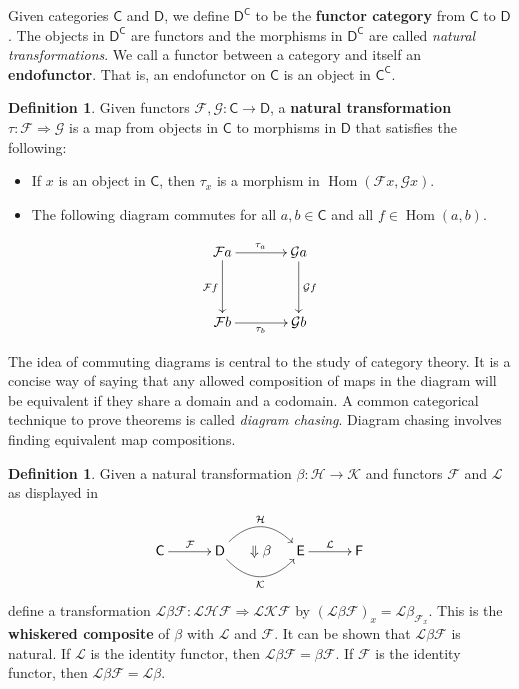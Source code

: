 \documentclass[MS, xcolor=dvipsnames]{wfuthesis}
\def\sC{\mathsf{C}}
\def\sD{\mathsf{D}}
\def\cF{\mathcal{F}}
\def\cG{\mathcal{G}}
\DeclareMathOperator{\Hom}{Hom}
\theoremstyle{definition}
\newtheorem{definition}[theorem]{Definition}
\begin{document}
Given categories $\sC$ and $\sD$, we define $\sD^\sC$ to be the \textbf{functor category} from $\sC$ to $\sD$. The objects in $\sD^\sC$ are functors and the morphisms in $\sD^\sC$ are called \emph{natural transformations}. We call a functor between a category and itself an \textbf{endofunctor}. That is, an endofunctor on $\sC$ is an object in $\sC^\sC$. 
\begin{definition}
  Given functors $\cF, \cG: \sC \to \sD$, a \textbf{natural transformation} $\tau: \cF \Rightarrow \cG$ is a map from objects in $\sC$ to morphisms in $\sD$ that satisfies the following:
  \begin{itemize}
    \item If $x$ is an object in $\sC$, then $\tau_x$ is a morphism in $\Hom(\cF x, \cG x)$. 
    \item The following diagram commutes for all $a,b \in \sC$ and all $f \in \Hom(a,b)$. 
  \end{itemize}
  \[ \SelectTips{cm}{}\xymatrix@R+1pc@C+1pc{
      \cF a \ar[r]^{\tau_a} \ar[d]_{\cF f} & \cG a \ar[d]^{\cG f} \\ \cF b \ar[r]_{\tau_b} & \cG b%
  } \]
\end{definition}
The idea of commuting diagrams is central to the study of category theory. It is a concise way of saying that any allowed composition of maps in the diagram will be equivalent if they share a domain and a codomain. A common categorical technique to prove theorems is called \emph{diagram chasing}. Diagram chasing involves finding equivalent map compositions. \par
\begin{definition}
  Given a natural transformation $\beta: \mathcal H \to \mathcal K$ and functors $\mathcal F$ and $\mathcal L$ as displayed in 
  \[ \SelectTips{cm}{}\xymatrix@C-1pc{
    \sC \ar[0,2]^{\cF} & & \sD \ar@/^1.5pc/[0,2]^{\mathcal H} \ar@/_1.5pc/[0,2]_{\mathcal K} & \Downarrow\beta & \mathsf E \ar[0,2]^{\mathcal L} & & \mathsf F
  } \]
  define a transformation $\mathcal L \beta \mathcal F: \mathcal L \mathcal H \mathcal F \Rightarrow \mathcal L \mathcal K \mathcal F$ by $(\mathcal L \beta \mathcal F)_x = \mathcal L \beta_{\mathcal F_x}$. This is the \textbf{whiskered composite} of $\beta$ with $\mathcal L$ and $\mathcal F$. It can be shown that $\mathcal L \beta \mathcal F$ is natural. If $\mathcal L$ is the identity functor, then $\mathcal L \beta \mathcal F = \beta \mathcal F$. If $\mathcal F$ is the identity functor, then  $\mathcal L \beta \mathcal F = \mathcal L \beta$. 
\end{definition}
\end{document}

